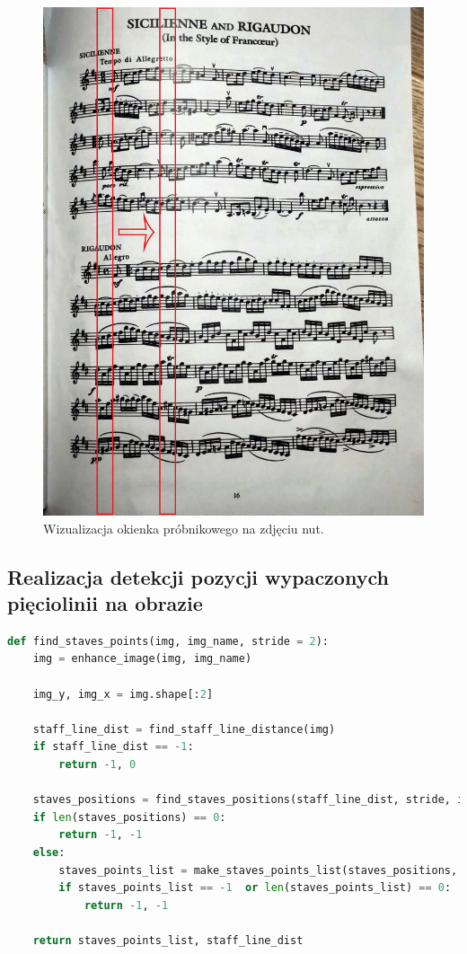 \begin{figure}[H]
	\centering
	\includegraphics[width=12cm]{images/probe window demo.jpg}
	\caption{Wizualizacja okienka próbnikowego na zdjęciu nut.}
	\label{fig:probe_window_demo}
\end{figure}

\pagebreak

\subsection{Realizacja detekcji pozycji wypaczonych pięciolinii na obrazie}

\begin{lstlisting}[caption={\pyth|find_staves_points()| - funkcja odnajdywania pozycji pięciolinii na obrazie}, label={find-staves-points}, language=Python]
def find_staves_points(img, img_name, stride = 2):
	img = enhance_image(img, img_name)
	
	img_y, img_x = img.shape[:2]
	
	staff_line_dist = find_staff_line_distance(img)
	if staff_line_dist == -1:
		return -1, 0
	
	staves_positions = find_staves_positions(staff_line_dist, stride, img)
	if len(staves_positions) == 0:
		return -1, -1
	else:
		staves_points_list = make_staves_points_list(staves_positions, staff_line_dist)
		if staves_points_list == -1  or len(staves_points_list) == 0:
			return -1, -1

	return staves_points_list, staff_line_dist
\end{lstlisting}

